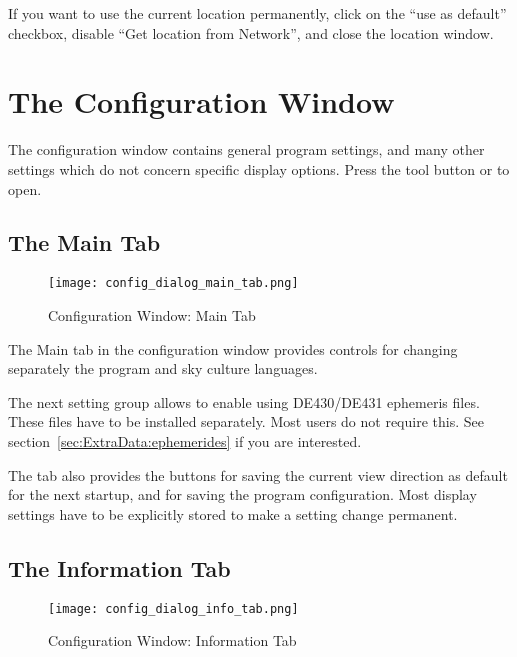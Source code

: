 \noindent If you want to use the current location permanently, click on the
``use as default'' checkbox, disable ``Get location from Network'',
and close the location window.



\section{The Configuration Window}
\label{sec:gui:configuration}

The configuration window contains general program settings, and many
other settings which do not concern specific display options. Press
the tool button  or  to open.


\subsection{The Main Tab}
\label{sec:gui:configuration:main}


\begin{figure}[bp]
\centering\texttt{[image: config\_dialog\_main\_tab.png]}
\caption{Configuration Window: Main Tab}
\label{fig:gui:configuration:main}
\end{figure}

The Main tab in the configuration window provides controls for
changing separately the program and sky culture languages.

The next setting group allows to enable using DE430/DE431 ephemeris files. 
These files have to be installed separately. Most users do not require this. 
See section~\ref{sec:ExtraData:ephemerides} if you are interested.

The tab also provides the buttons for saving the current view direction as default 
for the next startup, and for saving the program configuration. 
Most display settings have to be explicitly stored to make a setting change permanent.

\subsection{The Information Tab}
\label{sec:gui:configuration:info}


\begin{figure}[p]
\centering\texttt{[image: config\_dialog\_info\_tab.png]}
\caption{Configuration Window: Information Tab}
\label{fig:gui:configuration:info}
\end{figure}

